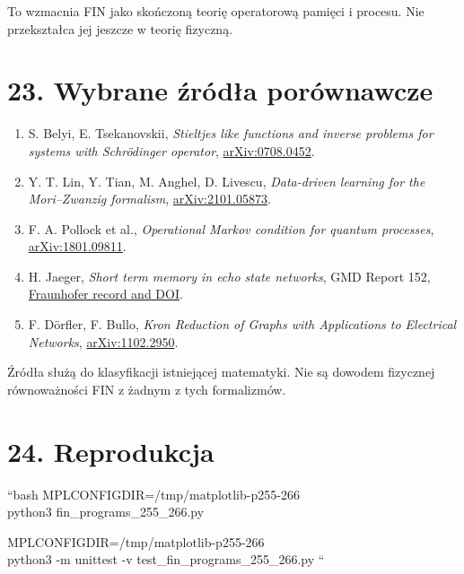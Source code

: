 \documentclass[11pt,a4paper,openany]{report}
\begin{document}
To wzmacnia FIN jako skończoną teorię operatorową pamięci i procesu. Nie przekształca jej jeszcze w teorię fizyczną.

\chapter{23. Wybrane źródła porównawcze}

\begin{enumerate}
\item 
S. Belyi, E. Tsekanovskii, \emph{Stieltjes like functions and inverse problems for systems with Schrödinger operator}, \href{https://arxiv.org/abs/0708.0452}{arXiv:0708.0452}.

\item 
Y. T. Lin, Y. Tian, M. Anghel, D. Livescu, \emph{Data-driven learning for the Mori--Zwanzig formalism}, \href{https://arxiv.org/abs/2101.05873}{arXiv:2101.05873}.

\item 
F. A. Pollock et al., \emph{Operational Markov condition for quantum processes}, \href{https://arxiv.org/abs/1801.09811}{arXiv:1801.09811}.

\item 
H. Jaeger, \emph{Short term memory in echo state networks}, GMD Report 152, \href{https://publica.fraunhofer.de/entities/publication/9dfaead1-4dc0-4e3c-b89b-596f50f671c1}{Fraunhofer record and DOI}.

\item 
F. Dörfler, F. Bullo, \emph{Kron Reduction of Graphs with Applications to Electrical Networks}, \href{https://arxiv.org/abs/1102.2950}{arXiv:1102.2950}.

\end{enumerate}

Źródła słu\.zą do klasyfikacji istniejącej matematyki. Nie są dowodem fizycznej równowa\.zności FIN z \.zadnym z tych formalizmów.

\chapter{24. Reprodukcja}

``bash MPLCONFIGDIR=/\allowbreak{}tmp/\allowbreak{}matplotlib-p255-266 \\
python3 fin\_programs\_255\_266.py

MPLCONFIGDIR=/\allowbreak{}tmp/\allowbreak{}matplotlib-p255-266 \\
python3 -m unittest -v test\_fin\_programs\_255\_266.py ``
\end{document}
